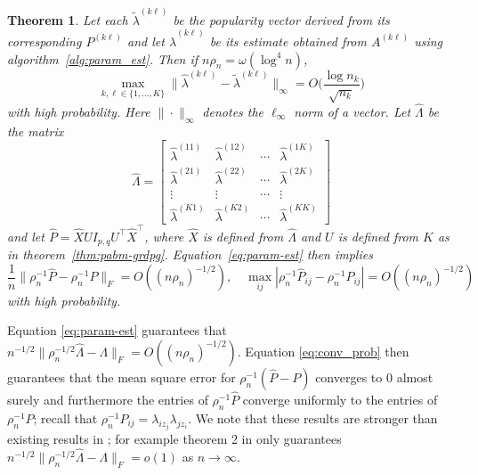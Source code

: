 \documentclass[
  12pt,
]{article}
\newtheorem{theorem}{Theorem}[section]
\theoremstyle{definition}
\theoremstyle{definition}
\theoremstyle{definition}
\theoremstyle{definition}
\theoremstyle{remark}
\begin{document}
\begin{theorem}
\label{thm:param-est}
Let each $\tilde{\lambda}^{(k \ell)}$ be the popularity vector derived from its corresponding $P^{(k \ell)}$ and let $\hat{\lambda}^{(k \ell)}$ be its estimate obtained from $A^{(k \ell)}$ using algorithm~\ref{alg:param_est}.
Then if $n \rho_n = \omega( \log^{4}{n})$,
\begin{equation} 
\label{eq:param-est}
\max_{k, \ell \in \{1, ..., K\}} 
\|\hat{\lambda}^{(k \ell)} - \tilde{\lambda}^{(k \ell)}\|_{\infty} = 
O\bigg(\frac{\log n_k}{\sqrt{n_k}} \bigg)
\end{equation}
with high probability. 
Here $\|\cdot\|_{\infty}$ denotes the $\ell_\infty$ norm of a vector. Let $\hat{\Lambda}$ be the matrix
$$\hat{\Lambda} = \begin{bmatrix} \hat{\lambda}^{(11)} &
\hat{\lambda}^{(12)} & \cdots & \hat{\lambda}^{(1 K)} \\
\hat{\lambda}^{(21)} &
\hat{\lambda}^{(22)} & \cdots & \hat{\lambda}^{(2 K)} \\
\vdots & \vdots & \cdots & \vdots \\
\hat{\lambda}^{(K1)} &
\hat{\lambda}^{(K2)} & \cdots & \hat{\lambda}^{(K K)} 
\end{bmatrix}$$
and let $\hat{P} = \hat{X} U I_{p,q} U^\top \hat{X}^{\top}$, where $\hat{X}$ is defined from $\hat{\Lambda}$ and $U$ is defined from $K$ as in theorem~\ref{thm:pabm-grdpg}. 
Equation~\eqref{eq:param-est} then implies
\begin{equation}
\label{eq:conv_prob}
\frac{1}{n} \|\rho_n^{-1} \hat{P} - \rho_n^{-1} P\|_{F} = O((n
\rho_n)^{-1/2}), \quad \max_{ij} |\rho_n^{-1} \hat{P}_{ij} -
\rho_n^{-1} P_{ij}| = O((n \rho_n)^{-1/2})
\end{equation}
with high probability. 
\end{theorem}

Equation \eqref{eq:param-est} guarantees that \(n^{-1/2} \|\rho_n^{-1/2} \hat{\Lambda} - \Lambda\|_{F} = O((n \rho_n)^{-1/2})\).
Equation \eqref{eq:conv_prob} then guarantees that the mean square error for \(\rho_n^{-1} (\hat{P} - P)\) converges to \(0\) almost surely and furthermore the entries of \(\rho_n^{-1} \hat{P}\) converge uniformly to the entries of \(\rho_n^{-1} P\);
recall that \(\rho_n^{-1} P_{ij} = \lambda_{iz_j} \lambda_{j z_i}\).
We note that these results are stronger than existing results in \citet{307cbeb9b1be48299388437423d94bf1};
for example theorem 2 in \citet{307cbeb9b1be48299388437423d94bf1} only guarantees
\(n^{-1/2} \|\rho_n^{-1/2} \hat{\Lambda} - \Lambda\|_{F} = o(1)\) as \(n \rightarrow \infty\).
\end{document}

